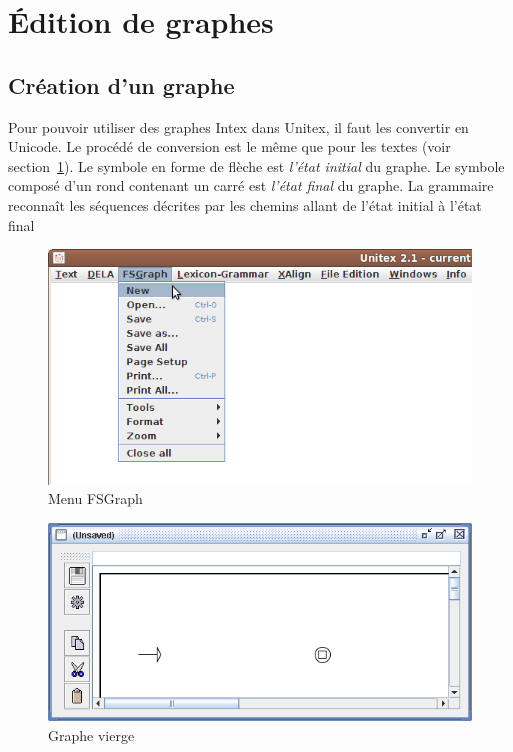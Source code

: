\section{Édition de graphes}
\label{section-editing-graphs}

\subsection{Création d'un graphe}
Pour pouvoir utiliser des graphes Intex dans Unitex, il faut les convertir en Unicode. Le
procédé de conversion est le même que pour les textes (voir section~\ref{fig-new-graph}).
Le symbole en forme de flèche est \textit{l'état initial} du graphe. Le symbole
composé d'un rond contenant un carré est  \textit{l'état final} du graphe. La
grammaire reconnaît les séquences décrites par les chemins allant de l'état initial à l'état final


\begin{figure}[!h]
\begin{center}
\includegraphics[width=13cm]{resources/img/fig5-1.png}
\caption{Menu FSGraph}
\end{center}
\end{figure}

\begin{figure}[!h]
\begin{center}
\includegraphics[width=14.5cm]{resources/img/fig5-2.png}
\caption{Graphe vierge\label{fig-new-graph}}
\end{center}
\end{figure}

